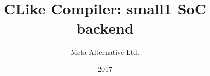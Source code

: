 

\title{CLike Compiler: small1 SoC backend}
\author{Meta Alternative Ltd.}
\date{2017}



\maketitle

\tableofcontents

\newpage











